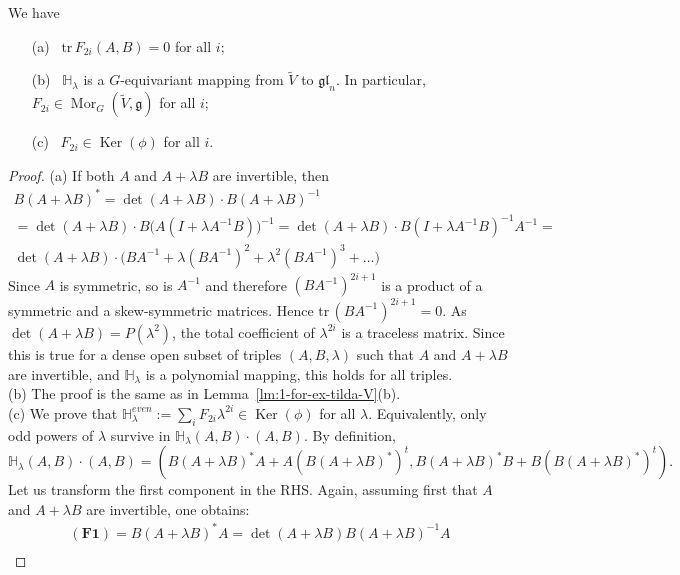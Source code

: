 \begin{ex}
\begin{thme}   \label{thm:sl-2-slag*} We have
\begin{itemize}
\item[\sf (a)]  \ ${{\mathrm{tr\,}}} F_{2i}(A,B)=0$ for all $i$;
\item[\sf (b)]  \ $\mathbb H_{\lambda}$ is a $G$-equivariant mapping from $\tilde V$ to ${{\mathfrak{gl}}_n}$. In particular, 
$F_{2i}\in {\operatorname{Mor}}_G(\tilde V,{{\mathfrak g}})$ for all $i$; 
\item[\sf (c)]  \ $F_{2i}\in {\operatorname{Ker}}(\phi)$ for all $i$.
\end{itemize}
\end{thme}
\begin{proof}
(a) If both $A$ and $A+{\lambda} B$ are invertible, then 
\begin{multline*}
B(A+{\lambda} B)^*=\det(A+{\lambda} B){\cdot}B(A+{\lambda} B)^{-1} \\
=\det(A+{\lambda} B){\cdot}B\bigl(A(I+{\lambda} A^{-1}B)\bigr)^{-1}= 
\det(A+{\lambda} B){\cdot}B(I+{\lambda} A^{-1}B)^{-1}A^{-1}= \\
\det(A+{\lambda} B){\cdot}\bigl(BA^{-1}+{\lambda} (BA^{-1})^2+{\lambda}^2(BA^{-1})^3+\dots\bigr)
\end{multline*}
Since $A$ is symmetric, so is $A^{-1}$ and therefore $(BA^{-1})^{2i+1}$ is a product of a symmetric and a 
skew-symmetric matrices. Hence ${{\mathrm{tr\,}}}(BA^{-1})^{2i+1}=0$. As $\det(A+{\lambda} B)=P({\lambda}^2)$, the total 
coefficient of ${\lambda}^{2i}$ is a traceless matrix. Since this is true for a dense open subset of triples
$(A,B,{\lambda})$ such that $A$ and $A+{\lambda} B$ are invertible, and $\mathbb H_{\lambda}$ is a polynomial mapping, this holds for all triples.
\\ \indent
(b) The proof is the same as in Lemma~\ref{lm:1-for-ex-tilda-V}(b).
\\ \indent
(c)   We prove that $\mathbb H_{\lambda}^{even}:=\sum_{i}F_{2i}{\lambda}^{2i}\in {\operatorname{Ker}}(\phi)$ for all ${\lambda}$. Equivalently, 
only odd powers of ${\lambda}$ survive in $\mathbb H_{\lambda}(A,B){\cdot}(A,B)$. By definition, 
\[
  \mathbb H_{\lambda}(A,B){\cdot}(A,B)=(B(A{+}{\lambda} B)^*A{+}A(B(A{+}{\lambda} B)^*)^t, B(A{+}{\lambda} B)^*B{+}B(B(A{+}{\lambda} B)^*)^t).
\]
Let us transform the first component in the RHS. Again, assuming first that $A$ and $A+{\lambda} B$ are invertible, one obtains:
\begin{multline*}
(\mathbf{F1})=
B(A{+}{\lambda} B)^*A=\det(A{+}{\lambda} B)B(A+{\lambda} B)^{-1}A\\

\end{multline*}
\end{proof}
\end{ex}
